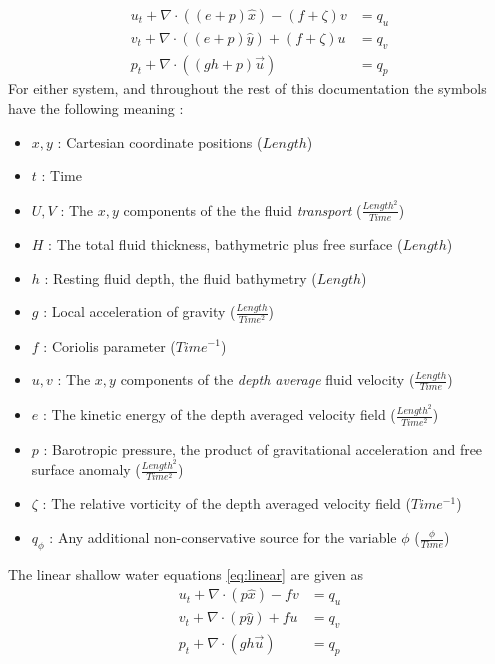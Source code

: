 \documentclass{softwaremanual}
\begin{document}
\begin{subequations}
\begin{align}
u_t  + \nabla \cdot \left( (e + p)\hat{x} \right) - (f+\zeta)v &=  q_u\\
v_t  + \nabla \cdot \left( (e + p)\hat{y} \right) + (f+\zeta)u &=  q_v\\
p_t + \nabla \cdot ( (gh+p)\vec{u} ) &= q_p 
\end{align}\label{eq:skewsymmetric}
\end{subequations}
For either system, and throughout the rest of this documentation the symbols have the following meaning :
\begin{itemize}
\item[] $x, y$ : Cartesian coordinate positions ($Length$)
\item[] $t$    : Time
\item[] $U, V$ : The $x,y$ components of the the fluid \textit{transport} ($\frac{Length^2}{Time}$) 
\item[] $H$    : The total fluid thickness, bathymetric plus free surface ($Length$)
\item[] $h$    : Resting fluid depth, the fluid bathymetry ($Length$)
\item[] $g$    : Local acceleration of gravity ($\frac{Length}{Time^2}$)
\item[] $f$    : Coriolis parameter ($Time^{-1}$)
\item[] $u,v$  : The $x,y$ components of the \textit{depth average} fluid velocity ($\frac{Length}{Time}$)
\item[] $e$    : The kinetic energy of the depth averaged velocity field ($\frac{Length^2}{Time^2}$)
\item[] $p$    : Barotropic pressure, the product of gravitational acceleration and free surface anomaly ($\frac{Length^2}{Time^2}$)
\item[] $\zeta$ : The relative vorticity of the depth averaged velocity field ($Time^{-1}$)
\item[] $q_{\phi}$ : Any additional non-conservative source for the variable $\phi$ ($\frac{\phi}{Time}$) 
\end{itemize}

The linear shallow water equations \eqref{eq:linear} are given as
\begin{subequations}
\begin{align}
u_t  + \nabla \cdot \left( p\hat{x} \right) - fv &=  q_u\\
v_t  + \nabla \cdot \left( p\hat{y} \right) + fu &=  q_v\\
p_t + \nabla \cdot ( gh\vec{u} ) &= q_p
\end{align}\label{eq:linear}
\end{subequations}
\end{document}
